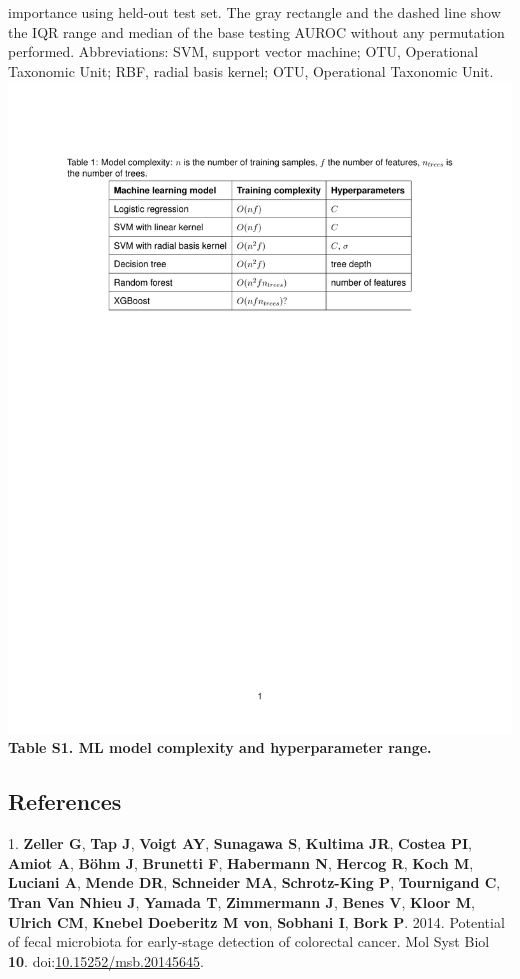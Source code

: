 \documentclass[11pt,]{article}
\begin{document}
importance using held-out test set. The gray rectangle and the dashed
line show the IQR range and median of the base testing AUROC without any
permutation performed. Abbreviations: SVM, support vector machine; OTU,
Operational Taxonomic Unit; RBF, radial basis kernel; OTU, Operational
Taxonomic Unit. \includegraphics{TableS1.pdf} \textbf{Table S1. ML model
complexity and hyperparameter range.} \newpage

\subsection{References}\label{references}

\hypertarget{refs}{}
\hypertarget{ref-zeller_potential_2014}{}
1. \textbf{Zeller G}, \textbf{Tap J}, \textbf{Voigt AY},
\textbf{Sunagawa S}, \textbf{Kultima JR}, \textbf{Costea PI},
\textbf{Amiot A}, \textbf{Böhm J}, \textbf{Brunetti F},
\textbf{Habermann N}, \textbf{Hercog R}, \textbf{Koch M},
\textbf{Luciani A}, \textbf{Mende DR}, \textbf{Schneider MA},
\textbf{Schrotz-King P}, \textbf{Tournigand C}, \textbf{Tran Van Nhieu
J}, \textbf{Yamada T}, \textbf{Zimmermann J}, \textbf{Benes V},
\textbf{Kloor M}, \textbf{Ulrich CM}, \textbf{Knebel Doeberitz M von},
\textbf{Sobhani I}, \textbf{Bork P}. 2014. Potential of fecal microbiota
for early-stage detection of colorectal cancer. Mol Syst Biol
\textbf{10}.
doi:\href{https://doi.org/10.15252/msb.20145645}{10.15252/msb.20145645}.
\end{document}
